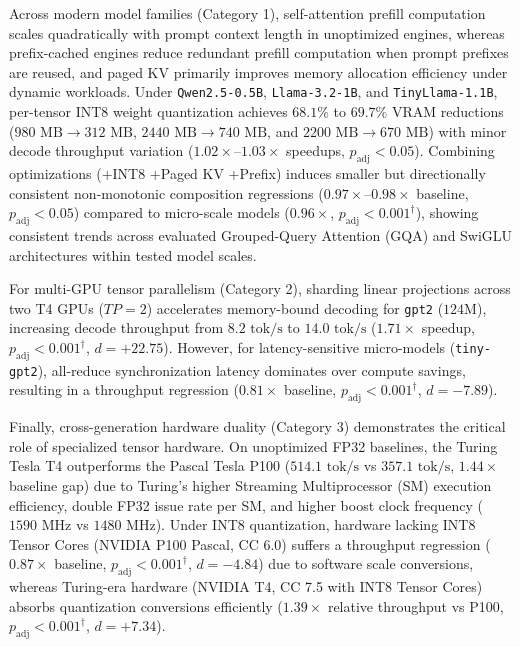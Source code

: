 Across modern model families (Category 1), self-attention prefill computation scales quadratically with prompt context length in unoptimized engines, whereas prefix-cached engines reduce redundant prefill computation when prompt prefixes are reused, and paged KV primarily improves memory allocation efficiency under dynamic workloads. Under \texttt{Qwen2.5-0.5B}, \texttt{Llama-3.2-1B}, and \texttt{TinyLlama-1.1B}, per-tensor INT8 weight quantization achieves $68.1\%$ to $69.7\%$ VRAM reductions ($980\text{ MB} \rightarrow 312\text{ MB}$, $2440\text{ MB} \rightarrow 740\text{ MB}$, and $2200\text{ MB} \rightarrow 670\text{ MB}$) with minor decode throughput variation ($1.02\times$--$1.03\times$ speedups, $p_{\text{adj}} < 0.05$). Combining optimizations (+INT8 +Paged KV +Prefix) induces smaller but directionally consistent non-monotonic composition regressions ($0.97\times$--$0.98\times$ baseline, $p_{\text{adj}} < 0.05$) compared to micro-scale models ($0.96\times$, $p_{\text{adj}} < 0.001^\dagger$), showing consistent trends across evaluated Grouped-Query Attention (GQA) and SwiGLU architectures within tested model scales.

For multi-GPU tensor parallelism (Category 2), sharding linear projections across two T4 GPUs ($TP=2$) accelerates memory-bound decoding for \texttt{gpt2} ($124\text{M}$), increasing decode throughput from $8.2\text{ tok/s}$ to $14.0\text{ tok/s}$ ($1.71\times$ speedup, $p_{\text{adj}} < 0.001^\dagger$, $d = +22.75$). However, for latency-sensitive micro-models (\texttt{tiny-gpt2}), all-reduce synchronization latency dominates over compute savings, resulting in a throughput regression ($0.81\times$ baseline, $p_{\text{adj}} < 0.001^\dagger$, $d = -7.89$).

Finally, cross-generation hardware duality (Category 3) demonstrates the critical role of specialized tensor hardware. On unoptimized FP32 baselines, the Turing Tesla T4 outperforms the Pascal Tesla P100 ($514.1\text{ tok/s}$ vs $357.1\text{ tok/s}$, $1.44\times$ baseline gap) due to Turing's higher Streaming Multiprocessor (SM) execution efficiency, double FP32 issue rate per SM, and higher boost clock frequency ($1590\text{ MHz}$ vs $1480\text{ MHz}$). Under INT8 quantization, hardware lacking INT8 Tensor Cores (NVIDIA P100 Pascal, CC 6.0) suffers a throughput regression ($0.87\times$ baseline, $p_{\text{adj}} < 0.001^\dagger$, $d = -4.84$) due to software scale conversions, whereas Turing-era hardware (NVIDIA T4, CC 7.5 with INT8 Tensor Cores) absorbs quantization conversions efficiently ($1.39\times$ relative throughput vs P100, $p_{\text{adj}} < 0.001^\dagger$, $d = +7.34$).



